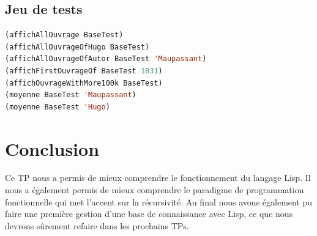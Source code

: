 \documentclass[a4paper,10pt]{report}
\begin{document}
\section*{Jeu de tests}

\begin{lstlisting}[language=Lisp]
(affichAllOuvrage BaseTest)
(affichAllOuvrageOfHugo BaseTest)
(affichAllOuvrageOfAutor BaseTest 'Maupassant)
(affichFirstOuvrageOf BaseTest 1831)
(affichOuvrageWithMore100k BaseTest)
(moyenne BaseTest 'Maupassant)
(moyenne BaseTest 'Hugo)
\end{lstlisting}

	  
\chapter*{Conclusion}

Ce TP nous a permis de mieux comprendre le fonctionnement du langage Lisp. Il nous a également permis de mieux comprendre le paradigme de programmation fonctionnelle qui 
met l'accent sur la récursivité. Au final nous avons également pu faire une première gestion d'une base de connaissance avec Lisp, ce que nous devrons sûrement refaire
dans les prochains TPs.
	  
	  
	  
	  
	  
	  
	  
	  
\end{document}

